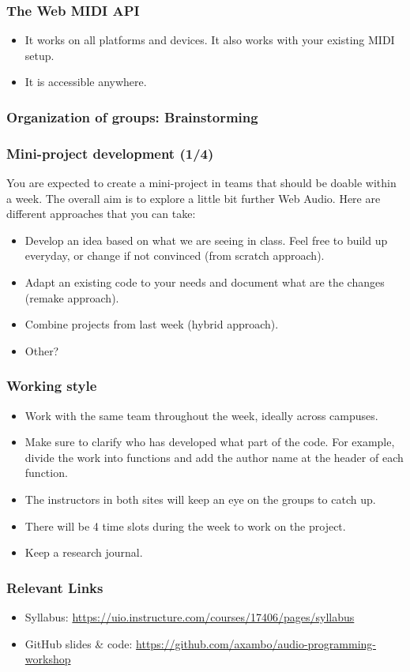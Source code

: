 \documentclass[screen, aspectratio=43]{beamer}
\begin{document}
%
\begin{frame}
\frametitle{The Web MIDI API}
\begin{itemize}
\item It works on all platforms and devices. It also works with your existing MIDI setup.
\item It is accessible anywhere.
\end{itemize}
\end{frame}
%
\begin{frame}
\frametitle{Organization of groups: Brainstorming}
\end{frame}
%
\begin{frame}
\frametitle{Mini-project development (1/4)}
You are expected to create a mini-project in teams that should be doable within a week. The overall aim is to explore a little bit further Web Audio. Here are different approaches that you can take:
\begin{itemize}
\item Develop an idea based on what we are seeing in class. Feel free to build up everyday, or change if not convinced (from scratch approach).
\item Adapt an existing code to your needs and document what are the changes (remake approach).
\item Combine projects from last week (hybrid approach).
\item Other?
\end{itemize}
\end{frame}
%
\begin{frame}
\frametitle{Working style}
\begin{itemize}
\item Work with the same team throughout the week, ideally across campuses. 
\item Make sure to clarify who has developed what part of the code. For example, divide the work into functions and add the author name at the header of each function.
\item The instructors in both sites will keep an eye on the groups to catch up.
\item There will be 4 time slots during the week to work on the project. 
\item Keep a research journal.
\end{itemize}
\end{frame}
%
\begin{frame}
\frametitle{Relevant Links}
\begin{itemize}
\item Syllabus: \url{https://uio.instructure.com/courses/17406/pages/syllabus}
\item GitHub slides \& code: \url{https://github.com/axambo/audio-programming-workshop}
\end{itemize}
\end{frame}
%
%
\end{document}
